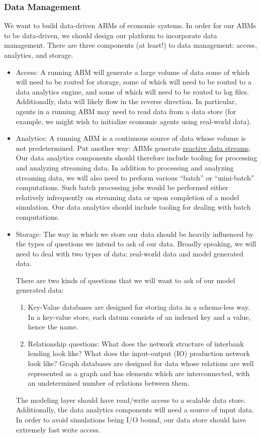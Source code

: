 \documentclass[11pt]{amsart}
\begin{document}
\subsubsection{Data Management}
We want to build data-driven ABMs of economic systems. In order for our ABMs to be data-driven, we should design our platform to incorporate data management. There are three components (at least!) to data management: access, analytics, and storage.
\begin{itemize}
    \item Access: A running ABM will generate a large volume of data some of which will need to be routed for storage, some of which will need to be routed to a data analytics engine, and some of which will need to be routed to log files. Additionally, data will likely flow in the reverse direction.  In particular, agents in a running ABM may need to read data from a data store (for example, we might wish to initialize economic agents using real-world data).
    \item Analytics: A running ABM is a continuous source of data whose volume is not predetermined. Put another way: ABMs generate \href{http://www.reactive-streams.org/}{reactive data streams}.  Our data analytics components should therefore include tooling for processing and analyzing streaming data. In addition to processing and analyzing streaming data, we will also need to preform various ``batch'' or ``mini-batch'' computations. Such batch processing jobs would be performed either relatively infrequently on streaming data or upon completion of a model simulation. Our data analytics should include tooling for dealing with batch computations.
    \item Storage: The way in which we store our data should be heavily influenced by the types of questions we intend to ask of our data. Broadly speaking, we will need to deal with two types of data: real-world data and model generated data.

    There are two kinds of questions that we will want to ask of our model generated data:
        \begin{enumerate}
            \item Key-Value databases are designed for storing data in a schema-less way. In a key-value store, each datum consists of an indexed key and a value, hence the name. 
            \item Relationship questions: What does the network structure of interbank lending look like? What does the input-output (IO) production network look like? Graph databases are designed for data whose relations are well represented as a graph and has elements which are interconnected, with an undetermined number of relations between them.
        \end{enumerate} 
    The modeling layer should have read/write access to a scalable data store. Additionally, the data analytics components will need a source of input data. In order to avoid simulations being I/O bound, our data store should have extremely fast write access.
\end{itemize}
\end{document}

